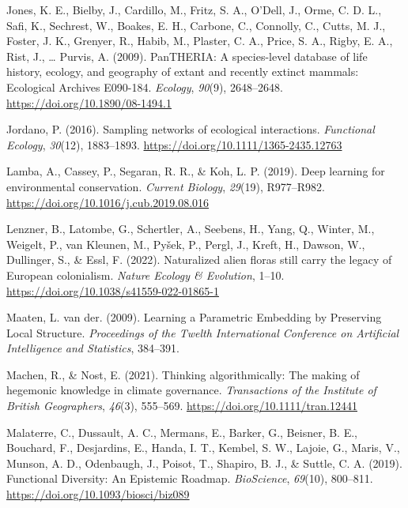\documentclass[10pt,oneside]{article}
\newlength{\cslhangindent}
\newenvironment{CSLReferences}[2] %
 {%
  \setlength{\parindent}{0pt}
  \ifodd #1 \everypar{\setlength{\hangindent}{\cslhangindent}}\ignorespaces\fi
  \ifnum #2 > 0
  \setlength{\parskip}{#2\baselineskip}
  \fi
 }%
 {}
\begin{document}
\begin{CSLReferences}{1}{0}
\leavevmode{}%
Jones, K. E., Bielby, J., Cardillo, M., Fritz, S. A., O'Dell, J., Orme,
C. D. L., Safi, K., Sechrest, W., Boakes, E. H., Carbone, C., Connolly,
C., Cutts, M. J., Foster, J. K., Grenyer, R., Habib, M., Plaster, C. A.,
Price, S. A., Rigby, E. A., Rist, J., \ldots{} Purvis, A. (2009).
PanTHERIA: A species-level database of life history, ecology, and
geography of extant and recently extinct mammals: Ecological Archives
E090-184. \emph{Ecology}, \emph{90}(9), 2648--2648.
\url{https://doi.org/10.1890/08-1494.1}

\leavevmode{}%
Jordano, P. (2016). Sampling networks of ecological interactions.
\emph{Functional Ecology}, \emph{30}(12), 1883--1893.
\url{https://doi.org/10.1111/1365-2435.12763}

\leavevmode{}%
Lamba, A., Cassey, P., Segaran, R. R., \& Koh, L. P. (2019). Deep
learning for environmental conservation. \emph{Current Biology},
\emph{29}(19), R977--R982.
\url{https://doi.org/10.1016/j.cub.2019.08.016}

\leavevmode{}%
Lenzner, B., Latombe, G., Schertler, A., Seebens, H., Yang, Q., Winter,
M., Weigelt, P., van Kleunen, M., Pyšek, P., Pergl, J., Kreft, H.,
Dawson, W., Dullinger, S., \& Essl, F. (2022). Naturalized alien floras
still carry the legacy of European colonialism. \emph{Nature Ecology \&
Evolution}, 1--10. \url{https://doi.org/10.1038/s41559-022-01865-1}

\leavevmode{}%
Maaten, L. van der. (2009). Learning a Parametric Embedding by
Preserving Local Structure. \emph{Proceedings of the Twelth
International Conference on Artificial Intelligence and Statistics},
384--391.

\leavevmode{}%
Machen, R., \& Nost, E. (2021). Thinking algorithmically: The making of
hegemonic knowledge in climate governance. \emph{Transactions of the
Institute of British Geographers}, \emph{46}(3), 555--569.
\url{https://doi.org/10.1111/tran.12441}

\leavevmode{}%
Malaterre, C., Dussault, A. C., Mermans, E., Barker, G., Beisner, B. E.,
Bouchard, F., Desjardins, E., Handa, I. T., Kembel, S. W., Lajoie, G.,
Maris, V., Munson, A. D., Odenbaugh, J., Poisot, T., Shapiro, B. J., \&
Suttle, C. A. (2019). Functional Diversity: An Epistemic Roadmap.
\emph{BioScience}, \emph{69}(10), 800--811.
\url{https://doi.org/10.1093/biosci/biz089}


\end{CSLReferences}
\end{document}
